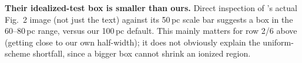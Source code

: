 \textbf{Their idealized-test box is smaller than ours.} Direct
inspection of \citeauthor{Smith2021}'s actual Fig.~2 image (not just
the text) against its 50\,pc scale bar suggests a box in the 60--80\,pc
range, versus our 100\,pc default. This mainly matters for row 2/6
above (getting close to our own half-width); it does not obviously
explain the uniform-scheme shortfall, since a bigger box cannot shrink
an ionized region.

